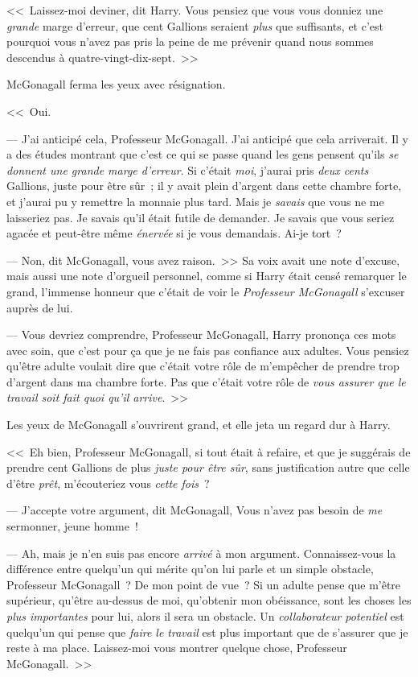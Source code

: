 <<~Laissez-moi deviner, dit Harry. Vous pensiez que vous vous donniez une \emph{grande} marge d'erreur, que cent Gallions seraient \emph{plus} que suffisants, et c'est pourquoi vous n'avez pas pris la peine de me prévenir quand nous sommes descendus à quatre-vingt-dix-sept.~>>

McGonagall ferma les yeux avec résignation.

<<~Oui.

--- J'ai anticipé cela, Professeur McGonagall. J'ai anticipé que cela arriverait. Il y a des études montrant que c'est ce qui se passe quand les gens pensent qu'ils \emph{se donnent une grande marge d'erreur}. Si c'était \emph{moi}, j'aurai pris \emph{deux cents} Gallions, juste pour être sûr~; il y avait plein d'argent dans cette chambre forte, et j'aurai pu y remettre la monnaie plus tard. Mais je \emph{savais} que vous ne me laisseriez pas. Je savais qu'il était futile de demander. Je savais que vous seriez agacée et peut-être même \emph{énervée} si je vous demandais. Ai-je tort~?

--- Non, dit McGonagall, vous avez raison.~>> Sa voix avait une note d'excuse, mais aussi une note d'orgueil personnel, comme si Harry était censé remarquer le grand, l'immense honneur que c'était de voir le \emph{Professeur McGonagall} s'excuser auprès de lui.

--- Vous devriez comprendre, Professeur McGonagall, Harry prononça ces mots avec soin, que c'est pour ça que je ne fais pas confiance aux adultes. Vous pensiez qu'être adulte voulait dire que c'était votre rôle de m'empêcher de prendre trop d'argent dans ma chambre forte. Pas que c'était votre rôle de \emph{vous assurer que le travail soit fait quoi qu'il arrive}.~>>

Les yeux de McGonagall s'ouvrirent grand, et elle jeta un regard dur à Harry.

<<~Eh bien, Professeur McGonagall, si tout était à refaire, et que je suggérais de prendre cent Gallions de plus \emph{juste pour être sûr}, sans justification autre que celle d'être \emph{prêt}, m'écouteriez vous \emph{cette fois}~?

--- J'accepte votre argument, dit McGonagall, Vous n'avez pas besoin de \emph{me} sermonner, jeune homme~!

--- Ah, mais je n'en suis pas encore \emph{arrivé} à mon argument. Connaissez-vous la différence entre quelqu'un qui mérite qu'on lui parle et un simple obstacle, Professeur McGonagall~? De mon point de vue~? Si un adulte pense que m'être supérieur, qu'être au-dessus de moi, qu'obtenir mon obéissance, sont les choses les \emph{plus importantes} pour lui, alors il sera un obstacle. Un \emph{collaborateur potentiel} est quelqu'un qui pense que \emph{faire le travail} est plus important que de s'assurer que je reste à ma place. Laissez-moi vous montrer quelque chose, Professeur McGonagall.~>>

